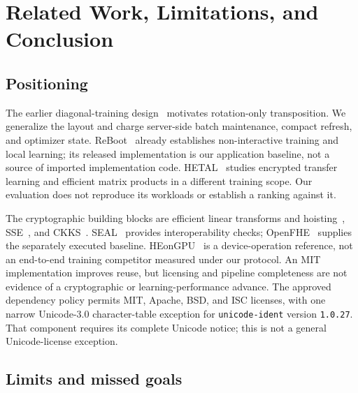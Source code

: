 \section{Related Work, Limitations, and Conclusion}
\label{sec:limits}
\subsection{Positioning}
The earlier diagonal-training design~\cite{mihara2020} motivates rotation-only transposition. We generalize the layout and charge server-side batch maintenance, compact refresh, and optimizer state. ReBoot~\cite{reboot2026} already establishes non-interactive training and local learning; its released implementation is our application baseline, not a source of imported implementation code. HETAL~\cite{hetal2023} studies encrypted transfer learning and efficient matrix products in a different training scope. Our evaluation does not reproduce its workloads or establish a ranking against it.

The cryptographic building blocks are efficient linear transforms and hoisting~\cite{halevi2018}, SSE~\cite{sse2022}, and CKKS~\cite{ckks2017}. SEAL~\cite{seal} provides interoperability checks; OpenFHE~\cite{openfhe2022} supplies the separately executed baseline. HEonGPU~\cite{gpuKeys2025,heongpuBench} is a device-operation reference, not an end-to-end training competitor measured under our protocol. An MIT implementation improves reuse, but licensing and pipeline completeness are not evidence of a cryptographic or learning-performance advance. The approved dependency policy permits MIT, Apache, BSD, and ISC licenses, with one narrow Unicode-3.0 character-table exception for \texttt{unicode-ident} version \texttt{1.0.27}. That component requires its complete Unicode notice; this is not a general Unicode-license exception.

\subsection{Limits and missed goals}
